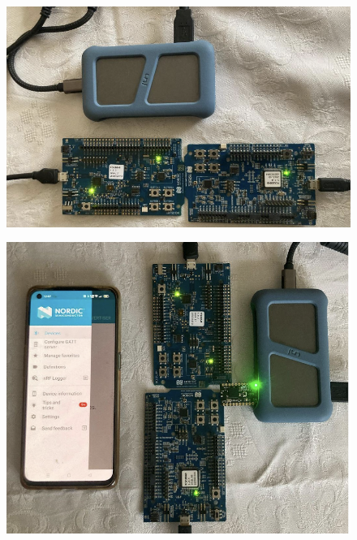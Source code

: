 \documentclass{Configuration_Files/PoliMi3i_thesis}
\begin{document}
\begin{figure}[h]
    \centering
    \includegraphics[scale=0.3]{Test_Procedure/5.png}
    \label{fig:ideal_tests_with_security}
\end{figure}

\begin{figure}[h]
    \centering
    \includegraphics[scale=0.3]{Test_Procedure/6.png}
    \label{fig:multicentral_implementation}
\end{figure}
\end{document}
